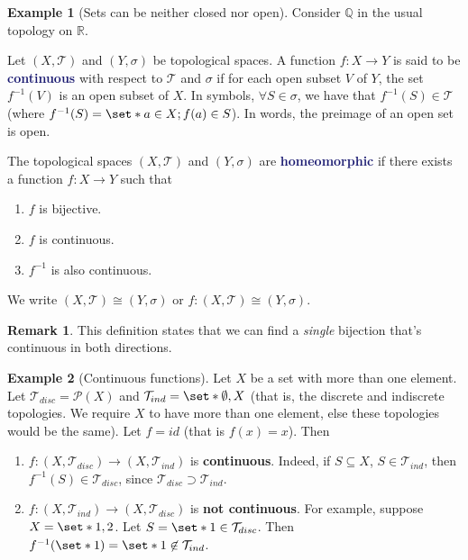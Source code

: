 \documentclass[11pt]{article}
\numberwithin{equation}{section}
\newcommand{\navy}[1]{\textcolor{MidnightBlue}{\bf #1}}
\newcounter{theo}[section]\setcounter{theo}{0}
\theoremstyle{definition}
\theoremstyle{definition}
\newtheorem{example}{\color{WildStrawberry}Example}[section]
\newtheorem*{remark}{Remark}
\newcommand\inv[1]{#1^{-1}}
\def\Set{\set*}%
\def\sse{\subseteq}
\newcommand{\1}{\mathbbm 1}
\newcommand{\RR}{\mathbb R}
\newcommand{\QQ}{\mathbb Q}
\newcommand{\pP}{\mathcal P}
\newcommand{\tT}{\mathcal T}
\begin{document}
\begin{example}[Sets can be neither closed nor open]
	Consider $\QQ$ in the usual topology on $\RR$. 
\end{example}


\begin{definition}[Continuous]
	Let $(X,\tT)$ and $(Y,\sigma)$ be topological spaces. A function $f : X \to Y$ is said to be \navy{continuous} with respect to $\tT$ and $\sigma$ if for each open subset $V$ of $Y$, the set $f^{-1}(V)$ is an open subset of $X$. In symbols, $\forall S \in \sigma$, we have that $\inv{f}(S) \in \tT$ (where $\inv{f}(S) = \Set{a \in X; f(a) \in S}$). In words, the preimage of an open set is open. 
\end{definition}

\begin{definition}[Homeomorphic]
	The topological spaces $(X,\tT)$ and $(Y,\sigma)$ are \navy{homeomorphic} if there exists a function $f: X \to Y$ such that 
	\begin{enumerate}
		\item $f$ is bijective.
		\item $f$ is continuous.
		\item $\inv{f}$ is also continuous. 
	\end{enumerate}
	We write $(X,\tT) \cong (Y,\sigma)$ or $f: (X,\tT) \cong (Y,\sigma)$. 
\end{definition}
\begin{remark}
	This definition states that we can find a \emph{single} bijection that's continuous in both directions. 
\end{remark}

\begin{example}[Continuous functions]
	Let $X$ be a set with more than one element. Let $\tT_{disc} = \pP(X)$ and $\tT_{ind} = \Set{\emptyset, X}$ (that is, the discrete and indiscrete topologies. We require $X$ to have more than one element, else these topologies would be the same). Let $f = id$ (that is $f(x) = x$). Then
	\begin{enumerate}
		\item $f: (X,\tT_{disc}) \to (X,\tT_{ind})$ is \textbf{continuous}. Indeed, if $S \sse X$, $S\in \tT_{ind}$, then $f^{-1}(S) \in \tT_{disc}$, since $\tT_{disc} \supset \tT_{ind}$. 

		\item $f: (X,\tT_{ind}) \to (X,\tT_{disc})$ is \textbf{not continuous}. For example, suppose $X = \Set{1,2}$. Let $S = \Set{1} \in \tT_{disc}$. Then $\inv{f}(\Set{1}) = \Set{1} \not \in \tT_{ind}$. 
	\end{enumerate}
\end{example}
\end{document}
